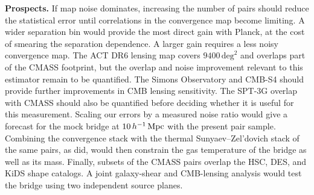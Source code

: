 \textbf{Prospects.} If map noise dominates, increasing the number of pairs
should reduce the statistical error until correlations in the convergence
map become limiting. A wider separation bin would provide the most direct
gain with Planck, at the cost of smearing the separation dependence. A larger
gain requires a less noisy convergence map. The ACT DR6 lensing map covers
$9400\,\mathrm{deg}^{2}$ and overlaps part of the CMASS footprint, but the
overlap and noise improvement relevant to this estimator remain to be
quantified. %
The Simons Observatory and CMB-S4 should provide further improvements in CMB
lensing sensitivity. %
The SPT-3G overlap with CMASS should also be quantified before deciding
whether it is useful for this measurement. Scaling our errors by a measured
noise ratio would give a forecast for the mock bridge at $10\,h^{-1}\,{\rm Mpc}$ with
the present pair sample. %
Combining the convergence stack with the
thermal Sunyaev--Zel'dovich stack of the same pairs, as \citet{deGraaff2019}
did, would then constrain the gas temperature of the bridge as well as its
mass. Finally, subsets of the CMASS pairs overlap the HSC, DES, and KiDS shape
catalogs. A joint galaxy-shear and CMB-lensing analysis would test the bridge
using two independent source planes. %
